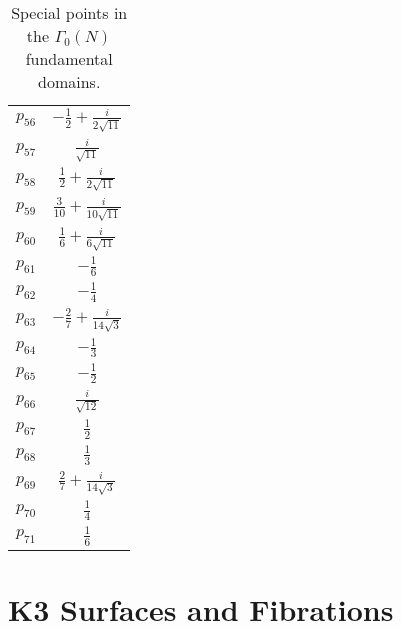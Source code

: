 \documentclass[11pt,a4paper]{article}
\numberwithin{equation}{section}
\numberwithin{table}{section}\setlength{\multlinegap}{25pt}
\begin{document}
\begin{table}
\begin{tabular}{lc}
    $p_{56}$ & $-\frac12+\frac{i}{2\sqrt{11}}$\\
    $p_{57}$ & $\frac{i}{\sqrt{11}}$\\
    $p_{58}$ & $\frac12+\frac{i}{2\sqrt{11}}$\\
    $p_{59}$ & $\frac{3}{10}+\frac{i}{10\sqrt{11}}$\\
    $p_{60}$ & $\frac{1}{6}+\frac{i}{6\sqrt{11}}$\\
    $p_{61}$ & $-\frac{1}{6}$\\
    $p_{62}$ & $-\frac{1}{4}$\\
    $p_{63}$ & $-\frac{2}{7}+\frac{i}{14\sqrt{3}}$\\
    $p_{64}$ & $-\frac{1}{3}$\\
    $p_{65}$ & $-\frac{1}{2}$\\
    $p_{66}$ & $\frac{i}{\sqrt{12}}$\\
    $p_{67}$ & $\frac{1}{2}$\\
    $p_{68}$ & $\frac{1}{3}$\\
    $p_{69}$ & $\frac{2}{7}+\frac{i}{14\sqrt{3}}$\\
    $p_{70}$ & $\frac{1}{4}$\\
    $p_{71}$ & $\frac{1}{6}$\\
    \bottomrule
    \end{tabular}\hspace{1ex}
    \caption{Special points in the $\Gamma_0(N)$ fundamental domains.}
    \label{tab:specialPoints}
\end{table}

\newpage
\section{K3 Surfaces and Fibrations}
\label{app:K3SurfacesAndFibrations}
\end{document}
